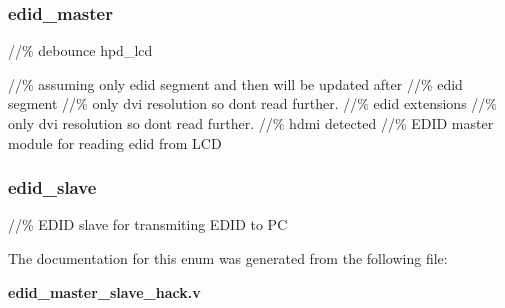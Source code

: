 \subsubsection[{edid\-\_\-byte\-\_\-lcd\-\_\-en}]{ {\bfseries \textcolor{vhdlchar}{ }} \hspace{0.3cm}}\label{enum1edid__master__slave__hack_a866cf0b4d0752d1359d63b1cb691ea59}
\subsubsection[{edidmaster}]{ {\bfseries \textcolor{vhdlchar}{edid\-\_\-master}\textcolor{vhdlchar}{ }} \hspace{0.3cm}}\label{enum1edid__master__slave__hack_ad058bff3b0664ef0473d1d21a34f9f53}


//\% debounce hpd\-\_\-lcd 

//\% assuming only edid segment and then will be updated after //\% edid segment //\% only dvi resolution so dont read further. //\% edid extensions //\% only dvi resolution so dont read further. //\% hdmi detected //\% E\-D\-I\-D master module for reading edid from L\-C\-D 
\subsubsection[{edidslave}]{ {\bfseries \textcolor{vhdlchar}{edid\-\_\-slave}\textcolor{vhdlchar}{ }} \hspace{0.3cm}}\label{enum1edid__master__slave__hack_ae3e3735d00160bf4bd0987150ee06467}


//\% E\-D\-I\-D slave for transmiting E\-D\-I\-D to P\-C 



The documentation for this enum was generated from the following file\-:\begin{DoxyCompactItemize}
\item 
{\bf edid\-\_\-master\-\_\-slave\-\_\-hack.\-v}\end{DoxyCompactItemize}
